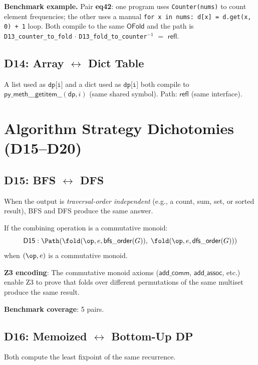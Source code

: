 \textbf{Benchmark example.}
Pair \textbf{eq42}: one program uses \texttt{Counter(nums)} to count
element frequencies; the other uses a manual \texttt{for x in nums:
d[x] = d.get(x, 0) + 1} loop.  Both compile to the same
$\mathsf{OFold}$ and the path is \texttt{D13\_counter\_to\_fold}
$\cdot$ \texttt{D13\_fold\_to\_counter}$^{-1}$ $=$ $\mathsf{refl}$.

\section{D14: Array $\leftrightarrow$ Dict Table}

A list used as $\texttt{dp[i]}$ and a dict used as $\texttt{dp[i]}$
both compile to $\mathsf{py\_meth\_\_\_getitem\_\_}(\mathsf{dp}, i)$
(same shared symbol).  Path: $\mathsf{refl}$ (same interface).


\chapter{Algorithm Strategy Dichotomies (D15--D20)}
\label{ch:algo-dichotomies}

\section{D15: BFS $\leftrightarrow$ DFS}

When the output is \emph{traversal-order independent} (e.g., a count,
sum, set, or sorted result), BFS and DFS produce the same answer.

\begin{theorem}
If the combining operation is a commutative monoid:
\[
  \mathsf{D15} : \Path(\fold(\op, e, \mathsf{bfs\_order}(G)),\;
  \fold(\op, e, \mathsf{dfs\_order}(G)))
\]
when $(\op, e)$ is a commutative monoid.
\end{theorem}

\textbf{Z3 encoding}: The commutative monoid axioms
($\mathsf{add\_comm}$, $\mathsf{add\_assoc}$, etc.) enable Z3 to
prove that folds over different permutations of the same multiset
produce the same result.

\textbf{Benchmark coverage}: 5 pairs.

\section{D16: Memoized $\leftrightarrow$ Bottom-Up DP}
\label{sec:d16-memo}

Both compute the least fixpoint of the same recurrence.

